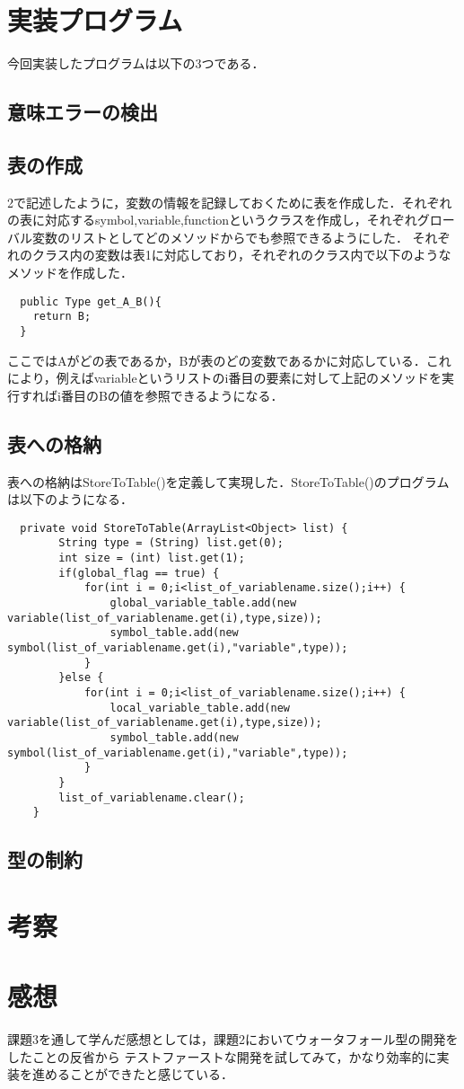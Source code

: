 \documentclass[dvipdfmx]{jarticle}
\begin{document}
\section{実装プログラム}
今回実装したプログラムは以下の3つである．
\subsection{意味エラーの検出}
\subsection{表の作成}
2で記述したように，変数の情報を記録しておくために表を作成した．それぞれの表に対応するsymbol,variable,functionというクラスを作成し，それぞれグローバル変数のリストとしてどのメソッドからでも参照できるようにした．
それぞれのクラス内の変数は表1に対応しており，それぞれのクラス内で以下のようなメソッドを作成した．
\begin{lstlisting}
  public Type get_A_B(){
    return B;
  }
\end{lstlisting}
ここではAがどの表であるか，Bが表のどの変数であるかに対応している．これにより，例えばvariableというリストのi番目の要素に対して上記のメソッドを実行すればi番目のBの値を参照できるようになる．
\subsection{表への格納}
表への格納はStoreToTable()を定義して実現した．StoreToTable()のプログラムは以下のようになる．
\begin{lstlisting}
  private void StoreToTable(ArrayList<Object> list) {
		String type = (String) list.get(0);
		int size = (int) list.get(1);
		if(global_flag == true) {
			for(int i = 0;i<list_of_variablename.size();i++) {
				global_variable_table.add(new variable(list_of_variablename.get(i),type,size));
				symbol_table.add(new symbol(list_of_variablename.get(i),"variable",type));
			}
		}else {
			for(int i = 0;i<list_of_variablename.size();i++) {
				local_variable_table.add(new variable(list_of_variablename.get(i),type,size));
				symbol_table.add(new symbol(list_of_variablename.get(i),"variable",type));
			}
		}
		list_of_variablename.clear();
	}
\end{lstlisting}

\subsection{型の制約}
\section{考察}
\section{感想}
課題3を通して学んだ感想としては，課題2においてウォータフォール型の開発をしたことの反省から
テストファーストな開発を試してみて，かなり効率的に実装を進めることができたと感じている．
\begin{thebibliography}{1}
\end{thebibliography}
\end{document}
